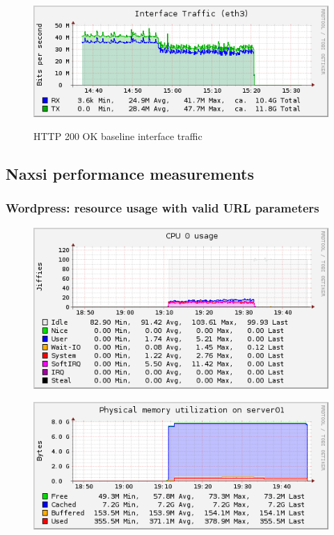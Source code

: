\documentclass[Measurement results]{subfiles}
\begin{document}
\begin{figure}[H]
\centering
\caption{HTTP 200 OK baseline interface traffic}
\includegraphics[scale=0.7]{images/results/baseline_200/interface.png}
\label{fig:Baseline Nginx interface traffic}
\end{figure}

\newpage
\subsection{Naxsi performance measurements}
\label{sec:Naxsi performance measurements}

\subsubsection{Wordpress: resource usage with valid URL parameters}
\begin{figure}[H]
\centering
\includegraphics[scale=0.7]{images/results/wp_with_naxsi_incremented_allowed_parameters/cpu.png}
\end{figure}

\begin{figure}[H]
\centering
\includegraphics[scale=0.7]{images/results/wp_with_naxsi_incremented_allowed_parameters/memory.png}
\end{figure}
\end{document}
